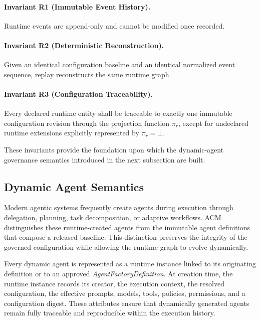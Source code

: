 \documentclass[10pt]{article}
\begin{document}
\paragraph{Invariant R1 (Immutable Event History).}

Runtime events are append-only and cannot be modified once recorded.

\paragraph{Invariant R2 (Deterministic Reconstruction).}

Given an identical configuration baseline and an identical normalized event
sequence, replay reconstructs the same runtime graph.

\paragraph{Invariant R3 (Configuration Traceability).}

Every declared runtime entity shall be traceable to exactly one immutable
configuration revision through the projection function $\pi_r$, except for
undeclared runtime extensions explicitly represented by $\pi_r=\bot$.

These invariants provide the foundation upon which the dynamic-agent
governance semantics introduced in the next subsection are built.

\subsection{Dynamic Agent Semantics}
\label{subsec:dynamic_agents}

Modern agentic systems frequently create agents during execution through delegation, planning, task decomposition, or adaptive workflows. ACM distinguishes these runtime-created agents from the immutable agent definitions that compose a released baseline. This distinction preserves the integrity of the governed configuration while allowing the runtime graph to evolve dynamically.

Every dynamic agent is represented as a runtime instance linked to its originating definition or to an approved \textit{AgentFactoryDefinition}. At creation time, the runtime instance records its creator, the execution context, the resolved configuration, the effective prompts, models, tools, policies, permissions, and a configuration digest. These attributes ensure that dynamically generated agents remain fully traceable and reproducible within the execution history.
\end{document}
